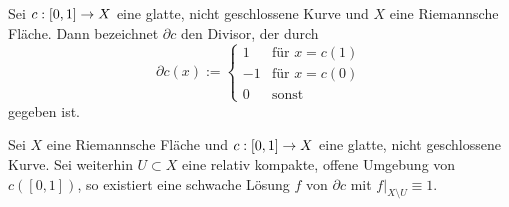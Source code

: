 \begin{defin}
  Sei $c: [0,1] \rightarrow X$ eine glatte, nicht geschlossene Kurve und $X$
  eine Riemannsche Fläche. Dann
  bezeichnet $\partial c$ den Divisor, der durch
  \[
  \partial c(x) :=
  \begin{cases}
    1 & \text{für } x = c(1) \\
    -1 & \text{für } x = c(0) \\
    0 & \text{sonst}
  \end{cases}
  \]
  gegeben ist.
\end{defin}

\begin{lemma}
  \label{lemma:schw-lsg-kurve}
  Sei $X$ eine Riemannsche Fläche und $c: [0,1] \rightarrow X$ eine glatte,
  nicht geschlossene
  Kurve. Sei weiterhin $U \subset X$ eine relativ kompakte, offene
  Umgebung von $c([0,1])$, so existiert eine schwache Lösung $f$ von
  $\partial c$ mit $f|_{X \setminus U} \equiv 1$.
\end{lemma}

